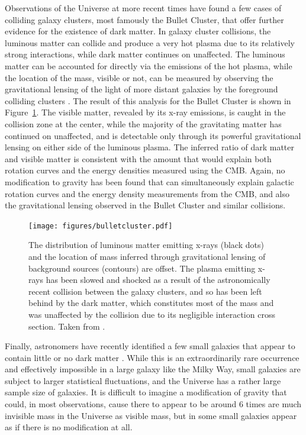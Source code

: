   Observations of the Universe at more recent times have found a few cases of colliding galaxy clusters, most famously the Bullet Cluster, that offer further evidence for the existence of dark matter.
  In galaxy cluster collisions, the luminous matter can collide and produce a very hot plasma due to its relatively strong interactions, while dark matter continues on unaffected.
  The luminous matter can be accounted for directly via the emissions of the hot plasma, while the location of the mass, visible or not, can be measured by observing the gravitational lensing of the light of more distant galaxies by the foreground colliding clusters \cite{bulletcluster}.
  The result of this analysis for the Bullet Cluster is shown in Figure~\ref{fig:bulletcluster}.
  The visible matter, revealed by its x-ray emissions, is caught in the collision zone at the center, while the majority of the gravitating matter has continued on unaffected, and is detectable only through its powerful gravitational lensing on either side of the luminous plasma.
  The inferred ratio of dark matter and visible matter is consistent with the amount that would explain both rotation curves and the energy densities measured using the CMB.
  Again, no modification to gravity has been found that can simultaneously explain galactic rotation curves and the energy density measurements from the CMB, and also the gravitational lensing observed in the Bullet Cluster and similar collisions.
  \begin{figure}[h!]
    \centering
    \texttt{[image: figures/bulletcluster.pdf]}
    \caption[Mass and x-ray distributions of the Bullet Cluster.]{
      The distribution of luminous matter emitting x-rays (black dots) and the location of mass inferred through gravitational lensing of background sources (contours) are offset.
      The plasma emitting x-rays has been slowed and shocked as a result of the astronomically recent collision between the galaxy clusters, and so has been left behind by the dark matter, which constitutes most of the mass and was unaffected by the collision due to its negligible interaction cross section.
      Taken from \cite{bulletcluster}.}
    \label{fig:bulletcluster}
  \end{figure}  

  Finally, astronomers have recently identified a few small galaxies that appear to contain little or no dark matter \cite{zeroDMgalaxy}.
  While this is an extraordinarily rare occurrence and effectively impossible in a large galaxy like the Milky Way, small galaxies are subject to larger statistical fluctuations, and the Universe has a rather large sample size of galaxies.
  It is difficult to imagine a modification of gravity that could, in most observations, cause there to appear to be around 6 times are much invisible mass in the Universe as visible mass, but in some small galaxies appear as if there is no modification at all.

